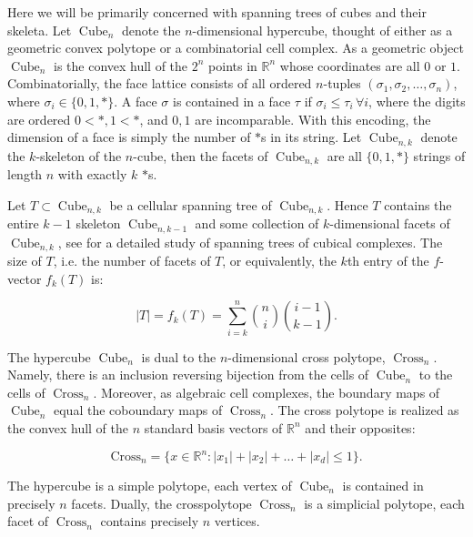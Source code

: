 \documentclass{amsart}
\DeclareMathOperator{\Cube}{Cube}
\DeclareMathOperator{\Cross}{Cross}
\begin{document}
Here we will be primarily concerned with spanning trees of cubes and their skeleta.  
Let $\Cube_n$ denote the $n$-dimensional hypercube, thought of either as a
geometric convex polytope or a combinatorial cell complex.  As a
geometric object $\Cube_n$ is the convex hull of the $2^n$ points in
$\mathbb{R}^n$ whose coordinates are all $0$ or $1$.  Combinatorially,
 the face lattice consists of all ordered $n$-tuples
$(\sigma_1, \sigma_2, \ldots, \sigma_n)$, where $\sigma_i \in
\{0,1,*\}$.  A face $\sigma$ is contained in a face $\tau$ if
$\sigma_i \leq \tau_i \, \forall i$, where the digits are ordered $0 <
*, 1 < *$, and $0,1$ are incomparable.  With this encoding, the
dimension of a face is simply the number of $*$s in its string.
  Let $\Cube_{n,k}$ denote the $k$-skeleton of the $n$-cube, then
the facets of $\Cube_{n,k}$ are all $\{0,1,*\}$ strings of length $n$ with
exactly $k$ $*$s.  

Let $T \subset \Cube_{n,k}$ be a cellular spanning tree of
$\Cube_{n,k}$.  Hence $T$ contains the entire $k-1$ skeleton
$\Cube_{n,{k-1}}$ and some collection of $k$-dimensional facets of
$\Cube_{n,k}$, see \cite{cubes} for a detailed study of spanning trees of cubical complexes.  The size of $T$, i.e. the number of facets of $T$, or equivalently, the
$k$th entry of the $f$-vector $f_k(T)$ is:




\begin{equation*}
\label{size}
|T| = f_k(T) = \sum_{i=k}^n { n \choose
  i} { i-1 \choose k-1}.
\end{equation*}





The hypercube $\Cube_n$ is dual  to the $n$-dimensional
cross polytope, $\Cross_n$.  Namely, there is an inclusion
reversing bijection from the cells of $\Cube_n$ to the cells of
$\Cross_n$.  Moreover, as algebraic cell complexes, the boundary maps of
$\Cube_n$ equal the coboundary maps of $\Cross_n$.  The cross
polytope is realized as the convex hull of the $n$ standard basis vectors of
$\mathbb{R}^n$ and their opposites:

$$ \textrm{Cross}_n = \{ x \in \mathbb{R}^n :  |x_1| + |x_2| + \ldots + |x_d| \leq 1 \}. $$

The hypercube is a simple polytope, each vertex of $\Cube_n$ is
contained in precisely $n$ facets.  Dually, the crosspolytope
$\Cross_n$ is a simplicial polytope, each facet of $\Cross_n$
contains precisely $n$ vertices.
\end{document}
